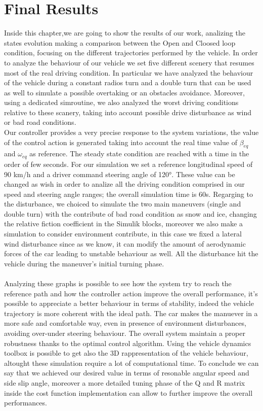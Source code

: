 
\chapter{Final Results}
Inside this chapter,we are going to show the results of our work, analizing the states evolution making a comparison between the Open and Cloosed loop condition, focusing on the different trajectories performed by the vehicle. In order to analyze the behaviour of our vehicle we set five different scenery that resumes most of the real driving condition. In particular we have analyzed the behaviour of the vehicle during a constant radios turn and a double turn that can be used as well to simulate a possible overtaking or an obstacles avoidance. Moreover, using a dedicated simroutine, we also analyzed the worst driving conditions relative to these scanery, taking into account possible drive disturbance as wind or bad road conditions. \\ 
Our controller provides a very precise response to the system variations, the value of the control action is generated taking into account the real time value of $\beta_{eq}$ and $\omega_{eq}$ as reference. The steady state condition are reached with a time in the order of few seconds. For our simulation we set a reference longitudinal speed of 90 km/h and a driver command steering angle of 120°. These value can be changed as wish in order to analize all the driving condition comprised in our speed and steering angle ranges; the overall simulation time is 60s. Regarging to the disturbance, we choiced to simulate the two main maneuvers (single and double turn) with the contribute of bad road condition as snow and ice, changing the relative fiction coefficient in the Simulik blocks, moreover we also make a simulation to consider environment contribute, in this case we fixed a lateral wind disturbance since as we know, it can modify the amount of aerodynamic forces of the car leading to unstable behaviour as well. All the disturbance hit the vehicle during the maneuver's initial turning phase.\\
\\
Analyzing these graphs is possible to see how the system try to reach the reference path and how the controller action improve the overall performance, it’s possible to appreciate a better behaviour in terms of stability, indeed the vehicle trajectory is more coherent with the ideal path. The car makes the manuever in a more safe and comfortable way, even in presence of environment  disturbances, avoiding over-under steering behaviour. The overall system maintain a proper robustness thanks to the optimal control algorithm. Using the vehicle dynamics toolbox is possible to get also the 3D rappresentation of the vehicle behaviour, altought these simulation require a lot of computational time. To conclude we can say that we achieved our desired value in terms of resonable angular speed and side slip angle, moreover a more detailed tuning phase of the Q and R matrix inside the cost function implementation can allow to further improve the overall performances.    

